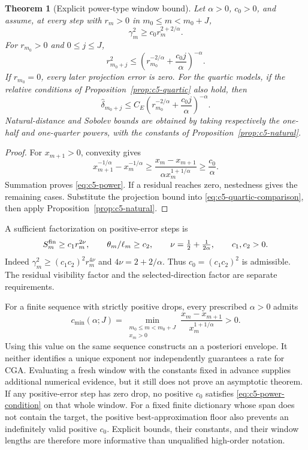 \documentclass[11pt]{article}
\newtheorem{theorem}{Theorem}[section]
\theoremstyle{remark}
\begin{document}
\begin{theorem}[Explicit power-type window bound]
\label{thm:c5-power}
Let $\alpha>0$, $c_0>0$, and assume, at every step with $r_m>0$
in $m_0\leq m<m_0+J$,
\begin{equation}
 \gamma_m^2\geq c_0r_m^{2+2/\alpha}.
 \label{eq:c5-power-condition}
\end{equation}
For $r_{m_0}>0$ and $0\leq j\leq J$,
\begin{equation}
 r_{m_0+j}^2\leq
 \left(r_{m_0}^{-2/\alpha}+\frac{c_0j}{\alpha}\right)^{-\alpha}.
 \label{eq:c5-power}
\end{equation}
If $r_{m_0}=0$, every later projection error is zero.
For the quartic models, if the relative conditions of
Proposition~\ref{prop:c5-quartic} also hold, then
\begin{equation}
 \widehat\delta_{m_0+j}\leq C_E
 \left(r_{m_0}^{-2/\alpha}+\frac{c_0j}{\alpha}\right)^{-\alpha}.
 \label{eq:c5-power-energy}
\end{equation}
Natural-distance and Sobolev bounds are obtained by taking respectively
the one-half and one-quarter powers, with the constants of
Proposition~\ref{prop:c5-natural}.
\end{theorem}
\begin{proof}
For $x_{m+1}>0$, convexity gives
\[
 x_{m+1}^{-1/\alpha}-x_m^{-1/\alpha}
 \geq\frac{x_m-x_{m+1}}{\alpha x_m^{1+1/\alpha}}
 \geq\frac{c_0}{\alpha}.
\]
Summation proves \eqref{eq:c5-power}. If a residual reaches zero,
nestedness gives the remaining cases. Substitute the projection bound
into \eqref{eq:c5-quartic-comparison}, then apply
Proposition~\ref{prop:c5-natural}.
\end{proof}

A sufficient factorization on positive-error steps is
\begin{equation}
 S_m^{\rm fin}\geq c_1r_m^{2\nu},\qquad
 \theta_m/\ell_m\geq c_2,\qquad
 \nu=\tfrac12+\tfrac1{2\alpha},\qquad c_1,c_2>0 .
 \label{eq:c5-power-factors}
\end{equation}
Indeed $\gamma_m^2\geq(c_1c_2)^2r_m^{4\nu}$ and
$4\nu=2+2/\alpha$. Thus $c_0=(c_1c_2)^2$ is admissible.
The residual visibility factor and the selected-direction factor are
separate requirements.

For a finite sequence with strictly positive drops, every prescribed
$\alpha>0$ admits
\[
 c_{\min}(\alpha;J)=
 \min_{\substack{m_0\leq m<m_0+J\\x_m>0}}
 \frac{x_m-x_{m+1}}{x_m^{1+1/\alpha}}>0 .
\]
Using this value on the same sequence constructs an a posteriori
envelope. It neither identifies a unique exponent nor independently
guarantees a rate for CGA. Evaluating a fresh window with the constants
fixed in advance supplies additional numerical evidence, but it still
does not prove an asymptotic theorem.
If any positive-error step has zero drop, no positive $c_0$ satisfies
\eqref{eq:c5-power-condition} on that whole window.
For a fixed finite dictionary whose span does not contain the target,
the positive best-approximation floor also prevents an indefinitely
valid positive $c_0$. Explicit bounds, their constants, and their
window lengths are therefore more informative than unqualified
high-order notation.
\end{document}
